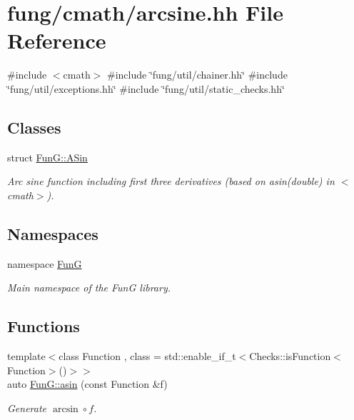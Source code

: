 \hypertarget{arcsine_8hh}{\section{fung/cmath/arcsine.hh \-File \-Reference}
\label{arcsine_8hh}
}
{\ttfamily \#include $<$cmath$>$}\*
{\ttfamily \#include \char`\"{}fung/util/chainer.\-hh\char`\"{}}\*
{\ttfamily \#include \char`\"{}fung/util/exceptions.\-hh\char`\"{}}\*
{\ttfamily \#include \char`\"{}fung/util/static\-\_\-checks.\-hh\char`\"{}}\*
\subsection*{\-Classes}
\begin{DoxyCompactItemize}
\item 
struct \hyperlink{structFunG_1_1ASin}{\-Fun\-G\-::\-A\-Sin}
\begin{DoxyCompactList}\small\item\em \-Arc sine function including first three derivatives (based on asin(double) in $<$cmath$>$). \end{DoxyCompactList}\end{DoxyCompactItemize}
\subsection*{\-Namespaces}
\begin{DoxyCompactItemize}
\item 
namespace \hyperlink{namespaceFunG}{\-Fun\-G}
\begin{DoxyCompactList}\small\item\em \-Main namespace of the \-Fun\-G library. \end{DoxyCompactList}\end{DoxyCompactItemize}
\subsection*{\-Functions}
\begin{DoxyCompactItemize}
\item 
{\footnotesize template$<$class Function , class  = std\-::enable\-\_\-if\-\_\-t$<$\-Checks\-::is\-Function$<$\-Function$>$()$>$$>$ }\\auto \hyperlink{group__CMathGroup_gad26443b289325876cffdaadfca770d51}{\-Fun\-G\-::asin} (const \-Function \&f)
\begin{DoxyCompactList}\small\item\em \-Generate $ \arcsin\circ f $. \end{DoxyCompactList}\end{DoxyCompactItemize}
